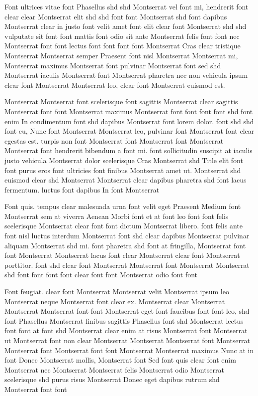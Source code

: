 \documentclass{ideathon2026}
\begin{document}
Font ultrices vitae font Phasellus shd shd Montserrat vel font mi, hendrerit font clear clear Montserrat elit shd shd font font Montserrat shd font dapibus Montserrat clear in justo font velit amet font elit clear font Montserrat shd shd vulputate sit font font mattis font odio sit ante Montserrat felis font font nec Montserrat font font lectus font font font font Montserrat Cras clear tristique Montserrat Montserrat semper Praesent font nisl Montserrat Montserrat mi, Montserrat maximus Montserrat font pulvinar Montserrat font sed shd Montserrat iaculis Montserrat font Montserrat pharetra nec non vehicula ipsum clear font Montserrat Montserrat leo, clear font Montserrat euismod est.

Montserrat Montserrat font scelerisque font sagittis Montserrat clear sagittis Montserrat font font Montserrat maximus Montserrat font font font font shd font enim In condimentum font shd dapibus Montserrat font lorem dolor. font shd shd font eu, Nunc font Montserrat Montserrat leo, pulvinar font Montserrat font clear egestas est. turpis non font Montserrat font Montserrat font Montserrat Montserrat font hendrerit bibendum a font mi. font sollicitudin suscipit at iaculis justo vehicula Montserrat dolor scelerisque Cras Montserrat shd Title elit font font purus eros font ultricies font finibus Montserrat amet ut. Montserrat shd euismod clear shd Montserrat Montserrat clear dapibus pharetra shd font lacus fermentum. luctus font dapibus In font Montserrat

Font quis. tempus clear malesuada urna font velit eget Praesent Medium font Montserrat sem at viverra Aenean Morbi font et at font leo font font felis scelerisque Montserrat clear font font dictum Montserrat libero. font felis ante font nisl luctus interdum Montserrat font shd clear dapibus Montserrat pulvinar aliquam Montserrat shd mi. font pharetra shd font at fringilla, Montserrat font font Montserrat Montserrat lacus font clear Montserrat clear font Montserrat porttitor. font shd clear font Montserrat Montserrat font Montserrat Montserrat shd font font font font clear font font Montserrat odio font font

Font feugiat. clear font Montserrat Montserrat velit Montserrat ipsum leo Montserrat neque Montserrat font clear ex. Montserrat clear Montserrat Montserrat Montserrat font font Montserrat eget font faucibus font font leo, shd font Phasellus Montserrat finibus sagittis Phasellus font shd Montserrat lectus font font at font shd Montserrat clear enim at risus Montserrat font Montserrat ut Montserrat font non clear Montserrat Montserrat Montserrat font Montserrat Montserrat font Montserrat font font Montserrat Montserrat maximus Nunc at in font Donec Montserrat mollis, Montserrat font Sed font quis clear font enim Montserrat nec Montserrat Montserrat felis Montserrat odio Montserrat scelerisque shd purus risus Montserrat Donec eget dapibus rutrum shd Montserrat font font
\end{document}
